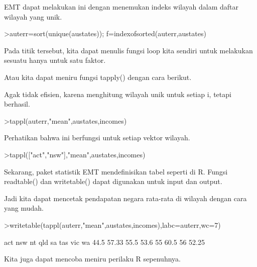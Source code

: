\documentclass[a4paper,10pt]{article}
\begin{document}
\begin{eulernotebook}
\begin{eulercomment}
EMT dapat melakukan ini dengan menemukan indeks wilayah dalam daftar
wilayah yang unik.
\end{eulercomment}
\begin{eulerprompt}
>auterr=sort(unique(austates)); f=indexofsorted(auterr,austates)
\end{eulerprompt}
\begin{euleroutput}
  [6,  5,  4,  2,  2,  3,  8,  8,  4,  7,  2,  7,  4,  4,  5,  6,  5,  3,
  8,  7,  4,  2,  2,  8,  5,  1,  2,  7,  7,  1]
\end{euleroutput}
\begin{eulercomment}
Pada titik tersebut, kita dapat menulis fungsi loop kita sendiri untuk
melakukan sesuatu hanya untuk satu faktor.

Atau kita dapat meniru fungsi tapply() dengan cara berikut.
\end{eulercomment}
\begin{eulercomment}
Agak tidak efisien, karena menghitung wilayah unik untuk setiap i,
tetapi berhasil.
\end{eulercomment}
\begin{eulerprompt}
>tappl(auterr,"mean",austates,incomes)
\end{eulerprompt}
\begin{euleroutput}
  [44.5,  57.3333333333,  55.5,  53.6,  55,  60.5,  56,  52.25]
\end{euleroutput}
\begin{eulercomment}
Perhatikan bahwa ini berfungsi untuk setiap vektor wilayah.
\end{eulercomment}
\begin{eulerprompt}
>tappl(["act","nsw"],"mean",austates,incomes)
\end{eulerprompt}
\begin{euleroutput}
  [44.5,  57.3333333333]
\end{euleroutput}
\begin{eulercomment}
Sekarang, paket statistik EMT mendefinisikan tabel seperti di R.
Fungsi readtable() dan writetable() dapat digunakan untuk input dan
output.

Jadi kita dapat mencetak pendapatan negara rata-rata di wilayah dengan
cara yang mudah.
\end{eulercomment}
\begin{eulerprompt}
>writetable(tappl(auterr,"mean",austates,incomes),labc=auterr,wc=7)
\end{eulerprompt}
\begin{euleroutput}
      act    nsw     nt    qld     sa    tas    vic     wa
     44.5  57.33   55.5   53.6     55   60.5     56  52.25
\end{euleroutput}
\begin{eulercomment}
Kita juga dapat mencoba meniru perilaku R sepenuhnya.


\end{eulercomment}
\end{eulernotebook}
\end{document}
